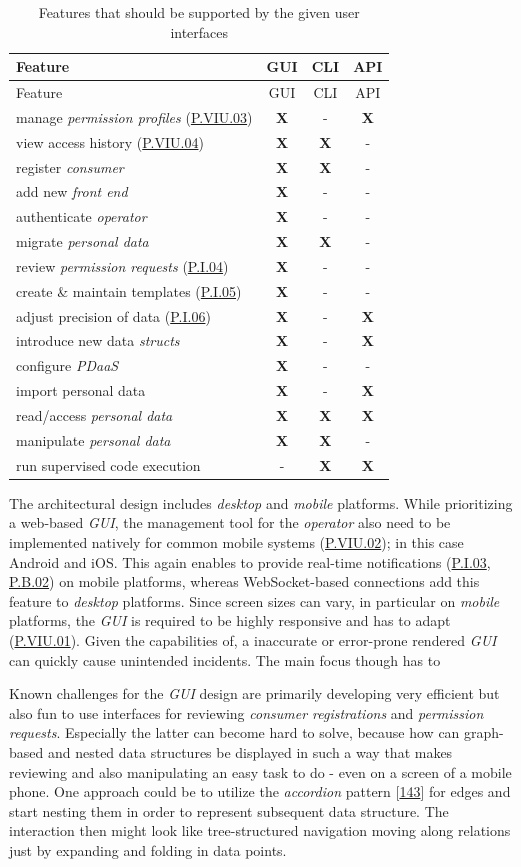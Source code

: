 \documentclass[12pt,english,a4paper,titlepage,cleardoublepage=empty,dottedtoc]{report}
\begin{document}
\begin{longtable}[]{@{}lccc@{}}
\caption{Features that should be supported by the given user interfaces
\label{tbl:ui-features}}\tabularnewline
\toprule
Feature & GUI & CLI & API\tabularnewline
\midrule
\endfirsthead
\toprule
Feature & GUI & CLI & API\tabularnewline
\midrule
\endhead
manage \emph{permission profiles} (\protect\hyperlink{pviu03}{P.VIU.03})
& \textbf{X} & - & \textbf{X}\tabularnewline
view access history (\protect\hyperlink{pviu04}{P.VIU.04}) & \textbf{X}
& \textbf{X} & -\tabularnewline
register \emph{consumer} & \textbf{X} & \textbf{X} & -\tabularnewline
add new \emph{front end} & \textbf{X} & - & -\tabularnewline
authenticate \emph{operator} & \textbf{X} & - & -\tabularnewline
migrate \emph{personal data} & \textbf{X} & \textbf{X} &
-\tabularnewline
review \emph{permission requests} (\protect\hyperlink{pi04}{P.I.04}) &
\textbf{X} & - & -\tabularnewline
create \& maintain templates (\protect\hyperlink{pi05}{P.I.05}) &
\textbf{X} & - & -\tabularnewline
adjust precision of data (\protect\hyperlink{pi06}{P.I.06}) & \textbf{X}
& - & \textbf{X}\tabularnewline
introduce new data \emph{structs} & \textbf{X} & - &
\textbf{X}\tabularnewline
configure \emph{PDaaS} & \textbf{X} & - & -\tabularnewline
import personal data & \textbf{X} & - & \textbf{X}\tabularnewline
read/access \emph{personal data} & \textbf{X} & \textbf{X} &
\textbf{X}\tabularnewline
manipulate \emph{personal data} & \textbf{X} & \textbf{X} &
-\tabularnewline
run supervised code execution & - & \textbf{X} &
\textbf{X}\tabularnewline
\bottomrule
\end{longtable}

The architectural design includes \emph{desktop} and \emph{mobile}
platforms. While prioritizing a web-based \emph{GUI}, the management
tool for the \emph{operator} also need to be implemented natively for
common mobile systems (\protect\hyperlink{pviu02}{P.VIU.02}); in this
case Android and iOS. This again enables to provide real-time
notifications (\protect\hyperlink{pi03}{P.I.03},
\protect\hyperlink{pb02}{P.B.02}) on mobile platforms, whereas
WebSocket-based connections add this feature to \emph{desktop}
platforms. Since screen sizes can vary, in particular on \emph{mobile}
platforms, the \emph{GUI} is required to be highly responsive and has to
adapt (\protect\hyperlink{pviu01}{P.VIU.01}). Given the capabilities of,
a inaccurate or error-prone rendered \emph{GUI} can quickly cause
unintended incidents. The main focus though has to

Known challenges for the \emph{GUI} design are primarily developing very
efficient but also fun to use interfaces for reviewing \emph{consumer
registrations} and \emph{permission requests}. Especially the latter can
become hard to solve, because how can graph-based and nested data
structures be displayed in such a way that makes reviewing and also
manipulating an easy task to do - even on a screen of a mobile phone.
One approach could be to utilize the \emph{accordion} pattern
{[}\protect\hyperlink{ref-web_2016_wikipedia_accordion-gui}{143}{]} for
edges and start nesting them in order to represent subsequent data
structure. The interaction then might look like tree-structured
navigation moving along relations just by expanding and folding in data
points.
\end{document}
